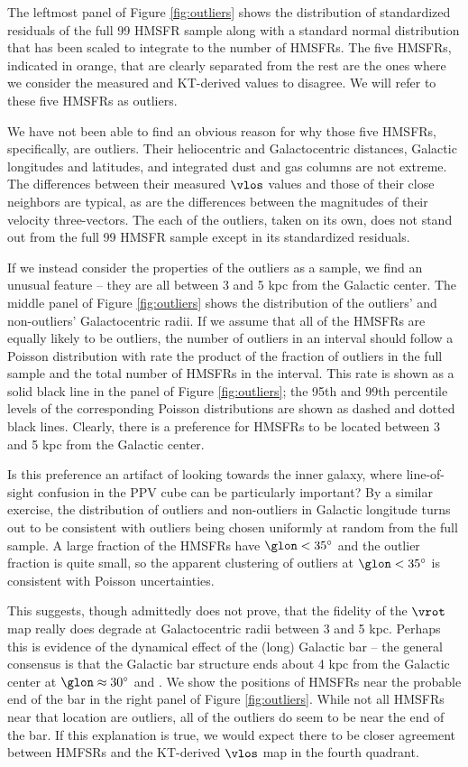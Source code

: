 The leftmost panel of Figure \ref{fig:outliers} shows the distribution of standardized residuals of the full 99 HMSFR sample along with a standard normal distribution that has been scaled to integrate to the number of HMSFRs.
The five HMSFRs, indicated in orange, that are clearly separated from the rest are the ones where we consider the measured and KT-derived values to disagree. We will refer to these five HMSFRs as outliers.

We have not been able to find an obvious reason for why those five HMSFRs, specifically, are outliers. 
Their heliocentric and Galactocentric distances, Galactic longitudes and latitudes, and integrated dust and gas columns are not extreme.
The differences between their measured $\vlos$ values and those of their close neighbors are typical, as are the differences between the magnitudes of their velocity three-vectors. 
The each of the outliers, taken on its own, does not stand out from the full 99 HMSFR sample except in its standardized residuals.

If we instead consider the properties of the outliers as a sample, we find an unusual feature -- they are all between 3 and 5 kpc from the Galactic center. 
The middle panel of Figure \ref{fig:outliers} shows the distribution of the outliers' and non-outliers' Galactocentric radii.
If we assume that all of the HMSFRs are equally likely to be outliers, the number of outliers in an interval should follow a Poisson distribution with rate the product of the fraction of outliers in the full sample and the total number of HMSFRs in the interval. 
This rate is shown as a solid black line in the panel of Figure \ref{fig:outliers}; the 95th and 99th percentile levels of the corresponding Poisson distributions are shown as dashed and dotted black lines.
Clearly, there is a preference for HMSFRs to be located between 3 and 5 kpc from the Galactic center.

Is this preference an artifact of looking towards the inner galaxy, where line-of-sight confusion in the PPV cube can be particularly important?
By a similar exercise, the distribution of outliers and non-outliers in Galactic longitude turns out to be consistent with outliers being chosen uniformly at random from the full sample. 
A large fraction of the HMSFRs have $\glon < 35^\circ$ and the outlier fraction is quite small, so the apparent clustering of outliers at $\glon < 35^\circ$ is consistent with Poisson uncertainties.

This suggests, though admittedly does not prove, that the fidelity of the $\vrot$ map really does degrade at Galactocentric radii between 3 and 5 kpc. 
Perhaps this is evidence of the dynamical effect of the (long) Galactic bar -- the general consensus is that the Galactic bar structure ends about 4 kpc from the Galactic center at $\glon \approx 30^\circ$ and \cite{2016arXiv160207702B}.
We show the positions of HMSFRs near the probable end of the bar in the right panel of Figure \ref{fig:outliers}.
While not all HMSFRs near that location are outliers, all of the outliers do seem to be near the end of the bar. 
If this explanation is true, we would expect there to be closer agreement between HMFSRs and the KT-derived $\vlos$ map in the fourth quadrant. 

